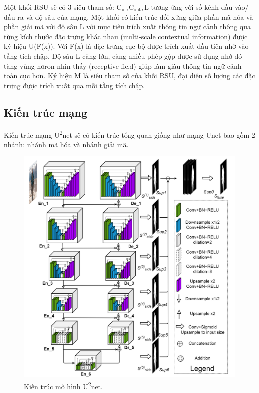 Một khối RSU sẽ có 3 siêu tham số: $\mathrm{C_{in}, C_{out}, L}$ tương ứng với số kênh đầu vào/đầu ra và độ sâu của mạng. Một khối có kiến trúc đối xứng giữa phần mã hóa và phần giải mã với độ sâu L với mục tiêu trích xuất thông tin ngữ cảnh thông qua từng kích thước đặc trưng khác nhau (multi-scale contextual information) được ký hiệu U(F(x)). Với F(x) là đặc trưng cục bộ được trích xuất đầu tiên nhờ vào tầng tích chập. Độ sâu L càng lớn, càng nhiều phép gộp được sử dụng nhờ đó tăng vùng nơron nhìn thấy (receptive field) giúp làm giàu thông tin ngữ cảnh toàn cục hơn. Ký hiệu M là siêu tham số của khối RSU, đại diện số lượng các đặc trưng được trích xuất qua mỗi tầng tích chập.

\subsection{Kiến trúc mạng}
Kiến trúc mạng U\textsuperscript{2}net sẽ có kiến trúc tổng quan giống như mạng Unet bao gồm 2 nhánh: nhánh mã hóa và nhánh giải mã.

\begin{figure}[H]
	\begin{center}
		\includegraphics[width=12cm]{images/blood/u2net_paper.png}
		\caption{Kiến trúc mô hình U\textsuperscript{2}net\cite{u2-net}. }
		\label{u2net_arch}
	\end{center}
\end{figure}
\vspace{-1.0cm}

